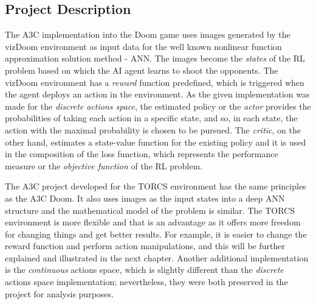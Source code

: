 \subsection{Project Description}
The A3C implementation into the Doom game uses images generated by the vizDoom environment as input data for the well known nonlinear function approximation solution method - ANN. The images become the \textit{states} of the RL problem based on which the AI agent learns to shoot the opponents. The vizDoom environment has a \textit{reward} function predefined, which is triggered when the agent deploys an action in the environment. As the given implementation was made for the \textit{discrete actions space}, the estimated policy or the \textit{actor} provides the probabilities of taking each action in a specific state, and so, in each state, the action with the maximal probability is chosen to be pursued. The \textit{critic}, on the other hand, estimates a state-value function for the existing policy and it is used in the composition of the loss function, which represents the performance measure or the \textit{objective function} of the RL problem.

The A3C project developed for the TORCS environment has the same principles as the A3C Doom. It also uses images as the input states into a deep ANN structure and the mathematical model of the problem is similar. The TORCS environment is more flexible and that is an advantage as it offers more freedom for changing things and get better results. For example, it is easier to change the reward function and perform action manipulations, and this will be further explained and illustrated in the next chapter. Another additional implementation is the \textit{continuous} actions space, which is slightly different than the \textit{discrete} actions space implementation; nevertheless, they were both preserved in the project for analysis purposes. 

